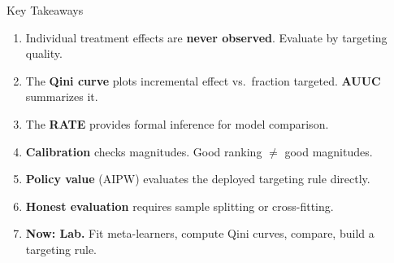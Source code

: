 \documentclass[aspectratio=169, 11pt]{beamer}
\begin{document}
\begin{frame}{Key Takeaways}
 
\begin{enumerate}
    \item Individual treatment effects are \textbf{never observed}. Evaluate by targeting quality.
 
    \medskip
 
    \item The \textbf{Qini curve} plots incremental effect vs.\ fraction targeted. \textbf{AUUC} summarizes it.
 
    \medskip
 
    \item The \textbf{RATE} provides formal inference for model comparison.
 
    \medskip
 
    \item \textbf{Calibration} checks magnitudes. Good ranking $\neq$ good magnitudes.
 
    \medskip
 
    \item \textbf{Policy value} (AIPW) evaluates the deployed targeting rule directly.
 
    \medskip
 
    \item \textbf{Honest evaluation} requires sample splitting or cross-fitting.
 
    \medskip
 
    \item \textbf{Now: Lab.} Fit meta-learners, compute Qini curves, compare, build a targeting rule.
\end{enumerate}
\end{frame}
 
\end{document}
